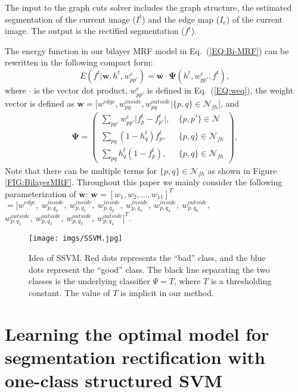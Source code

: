 \documentclass[10pt,journal,compsoc]{newIEEEtran}
\begin{document}
The input to the graph cuts solver includes the graph structure, the estimated segmentation of the current image ($I^t$) and the edge map ($I_e$) of the current image. The output is the rectified segmentation ($f^t$).

The energy function in our bilayer MRF model in Eq.~(\ref{EQ:Bi-MRF}) can be rewritten in the following compact form:
\begin{equation}\label{EQ:Bi-MRF_linear}
E(f^t|\mathbf{w},h^t,w^e_{pp'})
= \mathbf{w}\cdot \mathbf{\Psi}(h^t,w^e_{pp'},f^t),
\end{equation}
where $\cdot$ is the vector dot product, $w^e_{pp'}$ is defined in Eq.~(\ref{EQ:weq}), the weight vector is defined as $
\mathbf{w}=\big[w^{edge}, w^{inside}_{pq}, w^{outside}_{pq}|\{p,q\}\in \mathcal{N}_{fh}\big]
$, and
\begin{equation}\label{EQ:DefinePsi}
\begin{split}
\mathbf{\Psi} = \left(\begin{array}{lr}
                                              \sum_{pp'}w^{e}_{pp'} \big|f^{t}_p-{f^{t}_{p'}}\big|,&~\{p,p'\}\in\mathcal{N}~~ \\
                                              \sum_{pq}(1-h^t_q)f^{t}_p,&~\{p,q\}\in\mathcal{N}_{fh} \\
                                              \sum_{pq}h^t_q(1-f^{t}_p),&~\{p,q\}\in\mathcal{N}_{fh}
                                            \end{array}\right),
\end{split}
\end{equation}
Note that there can be multiple terms for $\{p,q\}\in \mathcal{N}_{fh}$ as shown in Figure \ref{FIG:BilayerMRF}. Throughout this paper we mainly consider the following parameterization of $\mathbf{w}$: $\mathbf{w} = [w_1,w_2,...,w_{11}]^T$$ = [w^{edge},~ w^{inside}_{p,q_0},~w^{inside}_{p,q_1}, ~w^{inside}_{p,q_2},~w^{inside}_{p,q_3},  ~w^{inside}_{p,q_4}, ~w^{outside}_{p,q_0}, $$ w^{outside}_{p,q_1},~ w^{outside}_{p,q_2},~w^{outside}_{p,q_3},~w^{outside}_{p,q_4}]^T$.

\begin{figure}[t]
  \centering
  \texttt{[image: imgs/SSVM.jpg]}
  \caption{Idea of SSVM. Red dots represents the ``bad'' class, and the blue dots represent the ``good'' class. The black line separating the two classes is the underlying classifier $\Psi=T$, where $T$ is a thresholding constant. The value of $T$ is implicit in our method.}\label{fig:SSVM}
\end{figure}\section{Learning the optimal model for segmentation rectification with one-class structured SVM}\label{SEC:OSSVM}
\end{document}
